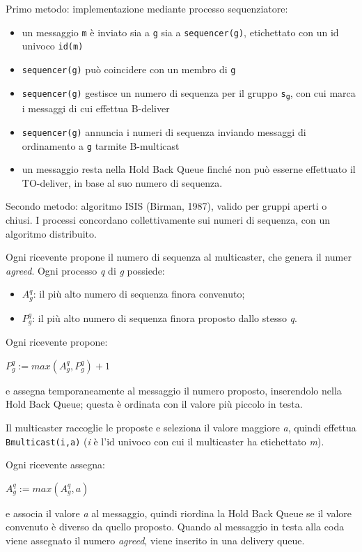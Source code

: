 Primo metodo: implementazione mediante processo sequenziatore:
\begin{itemize}
    \item un messaggio \texttt{m} è inviato sia a \texttt{g} sia a \texttt{sequencer(g)}, etichettato con un id univoco \texttt{id(m)}
    \item \texttt{sequencer(g)} può coincidere con un membro di \texttt{g}
    \item \texttt{sequencer(g)} gestisce un numero di sequenza per il gruppo \texttt{s\textsubscript{g}}, con cui marca i messaggi di cui effettua B-deliver
    \item \texttt{sequencer(g)} annuncia i numeri di sequenza inviando messaggi di ordinamento a \texttt{g} tarmite B-multicast
    \item un messaggio resta nella Hold Back Queue finché non può esserne effettuato il TO-deliver, in base al suo numero di sequenza.
\end{itemize}
Secondo metodo: algoritmo ISIS (Birman, 1987), valido per gruppi aperti o chiusi. I processi concordano collettivamente sui numeri di sequenza, con un algoritmo distribuito.

Ogni ricevente propone il numero di sequenza al multicaster, che genera il numer \textit{agreed}.
Ogni processo \textit{q} di \textit{g} possiede:
\begin{itemize}
    \item $A^{q}_{g}$: il più alto numero di sequenza finora convenuto;
    \item $P^{q}_{g}$: il più alto numero di sequenza finora proposto dallo stesso \textit{q}.
\end{itemize}
Ogni ricevente propone:
\begin{center}
    $P^{q}_{g}:= max(A^{q}_{g},P^{q}_{g})+1$
\end{center}
e assegna temporaneamente al messaggio il numero proposto, inserendolo nella Hold Back Queue; questa è ordinata con il valore più piccolo in testa.

Il multicaster raccoglie le proposte e seleziona il valore maggiore \textit{a}, quindi effettua \texttt{Bmulticast(i,a)} (\textit{i} è l'id univoco con cui il multicaster ha etichettato \textit{m}).

Ogni ricevente assegna:
\begin{center}
    $A^{q}_{g}:=max(A^{q}_{g},a)$
\end{center}
e associa il valore \textit{a} al messaggio, quindi riordina la Hold Back Queue se il valore convenuto è diverso da quello proposto. Quando al messaggio in testa alla coda viene assegnato il numero \textit{agreed}, viene inserito in una delivery queue.


